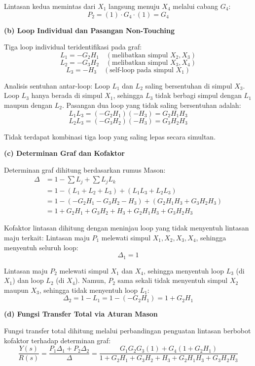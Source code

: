 \documentclass[11pt,a4paper]{article}
\begin{document}
Lintasan kedua memintas dari $X_1$ langsung menuju $X_4$ melalui cabang $G_4$:
$$P_2 = (1) \cdot G_4 \cdot (1) = G_4$$

\textbf{(b) Loop Individual dan Pasangan Non-Touching}

Tiga loop individual teridentifikasi pada graf:
$$L_1 = -G_2 H_1 \quad (\text{melibatkan simpul } X_2, X_3)$$
$$L_2 = -G_3 H_2 \quad (\text{melibatkan simpul } X_3, X_4)$$
$$L_3 = -H_3 \quad (\text{self-loop pada simpul } X_1)$$

Analisis sentuhan antar-loop:
Loop $L_1$ dan $L_2$ saling bersentuhan di simpul $X_3$.
Loop $L_3$ hanya berada di simpul $X_1$, sehingga $L_3$ tidak berbagi simpul dengan $L_1$ maupun dengan $L_2$.
Pasangan dua loop yang tidak saling bersentuhan adalah:
$$L_1 L_3 = (-G_2 H_1)(-H_3) = G_2 H_1 H_3$$
$$L_2 L_3 = (-G_3 H_2)(-H_3) = G_3 H_2 H_3$$

Tidak terdapat kombinasi tiga loop yang saling lepas secara simultan.

\textbf{(c) Determinan Graf dan Kofaktor}

Determinan graf dihitung berdasarkan rumus Mason:
\begin{align*}
    \Delta &= 1 - \sum L_j + \sum L_j L_k \\
    &= 1 - (L_1 + L_2 + L_3) + (L_1 L_3 + L_2 L_3) \\
    &= 1 - (-G_2 H_1 - G_3 H_2 - H_3) + (G_2 H_1 H_3 + G_3 H_2 H_3) \\
    &= 1 + G_2 H_1 + G_3 H_2 + H_3 + G_2 H_1 H_3 + G_3 H_2 H_3
\end{align*}

Kofaktor lintasan dihitung dengan meninjau loop yang tidak menyentuh lintasan maju terkait:
Lintasan maju $P_1$ melewati simpul $X_1, X_2, X_3, X_4$, sehingga menyentuh seluruh loop:
$$\Delta_1 = 1$$

Lintasan maju $P_2$ melewati simpul $X_1$ dan $X_4$, sehingga menyentuh loop $L_3$ (di $X_1$) dan loop $L_2$ (di $X_4$). Namun, $P_2$ sama sekali tidak menyentuh simpul $X_2$ maupun $X_3$, sehingga tidak menyentuh loop $L_1$:
$$\Delta_2 = 1 - L_1 = 1 - (-G_2 H_1) = 1 + G_2 H_1$$

\textbf{(d) Fungsi Transfer Total via Aturan Mason}

Fungsi transfer total dihitung melalui perbandingan penguatan lintasan berbobot kofaktor terhadap determinan graf:
$$\frac{Y(s)}{R(s)} = \frac{P_1 \Delta_1 + P_2 \Delta_2}{\Delta} = \frac{G_1 G_2 G_3 (1) + G_4 (1 + G_2 H_1)}{1 + G_2 H_1 + G_3 H_2 + H_3 + G_2 H_1 H_3 + G_3 H_2 H_3}$$
\end{document}
